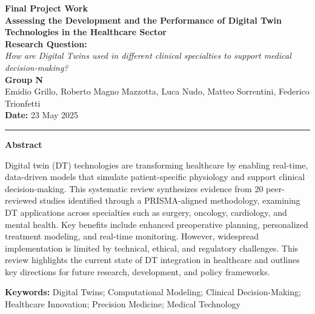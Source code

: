 \documentclass[10pt,a4paper]{article}
\begin{document}
\begin{center}
    {\LARGE \bfseries Final Project Work}\\[8pt]
    {\Huge \bfseries Assessing the Development and the Performance of Digital Twin Technologies in the Healthcare Sector}\\[15pt]
    {\large \textbf{Research Question:}}\\[2pt]
    {\large \itshape How are Digital Twins used in different clinical specialties to support medical decision-making?}\\[15pt]
    {\large \textbf{Group N}}\\[5pt]
    Emidio Grillo, Roberto Magno Mazzotta, Luca Nudo, Matteo Sorrentini, Federico Trionfetti\\[10pt]
    {\normalsize \textbf{Date:} 23 May 2025}
\end{center}

\vspace{6em}

\vspace{1em}
\hrule
\vspace{2em}

\begin{center}
    {\Large \textbf{Abstract}} %
\end{center}

\begin{center}
\begin{minipage}{0.85\textwidth}
\noindent
Digital twin (DT) technologies are transforming healthcare by enabling real-time, data-driven models that simulate patient-specific physiology and support clinical decision-making. This systematic review synthesizes evidence from 20 peer-reviewed studies identified through a PRISMA-aligned methodology, examining DT applications across specialties such as surgery, oncology, cardiology, and mental health. Key benefits include enhanced preoperative planning, personalized treatment modeling, and real-time monitoring. However, widespread implementation is limited by technical, ethical, and regulatory challenges. This review highlights the current state of DT integration in healthcare and outlines key directions for future research, development, and policy frameworks.
\vspace{1em}

\textbf{Keywords:} Digital Twins; Computational Modeling; Clinical Decision-Making; Healthcare Innovation; Precision Medicine; Medical Technology
\end{minipage}
\end{center}
\end{document}
